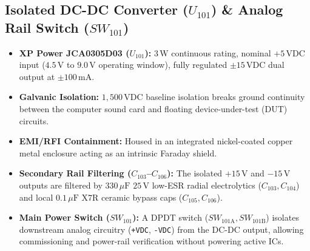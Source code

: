 \documentclass[11pt, letterpaper]{article}
\begin{document}
\subsection{Isolated DC-DC Converter \texorpdfstring{($U_{101}$)}{(U101)} \& Analog Rail Switch \texorpdfstring{($SW_{101}$)}{(SW101)}}
\begin{itemize}[leftmargin=1.5em]
    \item \textbf{XP Power JCA0305D03 ($U_{101}$):} $3\,\text{W}$ continuous rating, nominal $+5\,\text{VDC}$ input ($4.5\,\text{V}$ to $9.0\,\text{V}$ operating window), fully regulated $\pm 15\,\text{VDC}$ dual output at $\pm 100\,\text{mA}$.
    \item \textbf{Galvanic Isolation:} $1,500\,\text{VDC}$ baseline isolation breaks ground continuity between the computer sound card and floating device-under-test (DUT) circuits.
    \item \textbf{EMI/RFI Containment:} Housed in an integrated nickel-coated copper metal enclosure acting as an intrinsic Faraday shield.
    \item \textbf{Secondary Rail Filtering ($C_{103}$--$C_{106}$):} The isolated $+15\,\text{V}$ and $-15\,\text{V}$ outputs are filtered by $330\,\mu\text{F}$ $25\,\text{V}$ low-ESR radial electrolytics ($C_{103}, C_{104}$) and local $0.1\,\mu\text{F}$ X7R ceramic bypass caps ($C_{105}, C_{106}$).
    \item \textbf{Main Power Switch ($SW_{101}$):} A DPDT switch ($SW_{101\text{A}}, SW_{101\text{B}}$) isolates downstream analog circuitry (\texttt{+VDC}, \texttt{-VDC}) from the DC-DC output, allowing commissioning and power-rail verification without powering active ICs.
\end{itemize}
\end{document}
